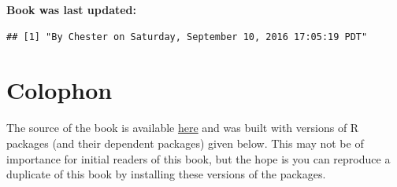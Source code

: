 \documentclass[]{tufte-book}
\begin{document}
\textbf{Book was last updated:}

\begin{verbatim}
## [1] "By Chester on Saturday, September 10, 2016 17:05:19 PDT"
\end{verbatim}

\section*{Colophon}\label{colophon}

The source of the book is available
\href{https://github.com/ismayc/moderndiver-book}{here} and was built
with versions of R packages (and their dependent packages) given below.
This may not be of importance for initial readers of this book, but the
hope is you can reproduce a duplicate of this book by installing these
versions of the packages.
\end{document}
